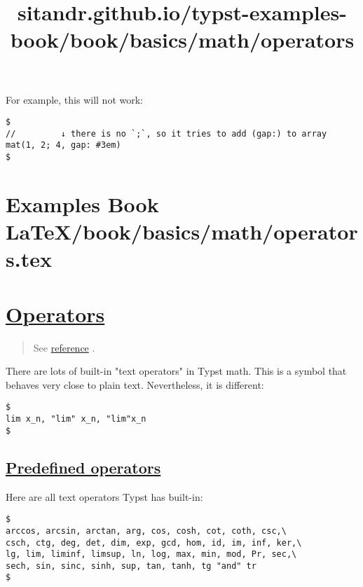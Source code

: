 For example, this will not work:

\begin{verbatim}
$
//         ↓ there is no `;`, so it tries to add (gap:) to array
mat(1, 2; 4, gap: #3em)
$
\end{verbatim}


\section{Examples Book LaTeX/book/basics/math/operators.tex}
\title{sitandr.github.io/typst-examples-book/book/basics/math/operators}

\section{\texorpdfstring{\hyperref[operators]{Operators}}{Operators}}\label{operators}

\begin{quote}
See \href{https://typst.app/docs/reference/math/op/}{reference} .
\end{quote}

There are lots of built-in "text operators" in Typst math. This is a
symbol that behaves very close to plain text. Nevertheless, it is
different:

\begin{verbatim}
$
lim x_n, "lim" x_n, "lim"x_n
$
\end{verbatim}

\pandocbounded{}

\subsection{\texorpdfstring{\hyperref[predefined-operators]{Predefined
operators}}{Predefined operators}}\label{predefined-operators}

Here are all text operators Typst has built-in:

\begin{verbatim}
$
arccos, arcsin, arctan, arg, cos, cosh, cot, coth, csc,\
csch, ctg, deg, det, dim, exp, gcd, hom, id, im, inf, ker,\
lg, lim, liminf, limsup, ln, log, max, min, mod, Pr, sec,\
sech, sin, sinc, sinh, sup, tan, tanh, tg "and" tr
$
\end{verbatim}

\pandocbounded{}

